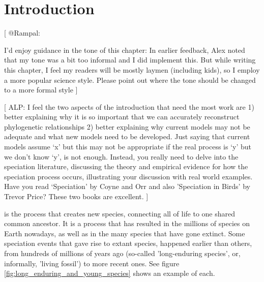 \chapter{Introduction}
\label{chapter_introduction}
\newpage

[
  @Rampal:

  I'd enjoy guidance in the tone of this chapter:
  In earlier feedback, Alex noted that my tone was a bit too informal
  and I did implement this.
  But while writing this chapter, I feel my readers will be mostly 
  laymen (including kids), so I employ a more popular science style.
  Please point out where the tone should be changed to a more formal style
]


[
  ALP:
  I feel the two aspects of the introduction that need the most work are 
  1) better explaining why it is so important 
     that we can accurately reconstruct phylogenetic relationships 
  2) better explaining why current models may not be adequate 
     and what new models need to be developed. Just saying that current 
     models assume ‘x’ but this may not be appropriate if the real process 
     is ‘y’ but we don’t know ‘y’, is not enough. Instead, you really need to 
     delve into the speciation literature, discussing the theory and 
     empirical evidence for how the speciation process occurs, 
     illustrating your discussion with real world examples. 
     Have you read ‘Speciation' by Coyne and Orr and also 'Speciation 
     in Birds' by Trevor Price? These two books are excellent.
]

\noindent 
{} is the process that creates new species,
connecting all of life to one shared common ancestor. It is a process
that has resulted in the millions of species on Earth nowadays, 
as well as in the many species that have gone extinct.
Some speciation events that gave rise to extant species, 
happened earlier than others,
from hundreds of millions of years ago (so-called 'long-enduring species',
or, informally, 'living fossil') 
to more recent ones. See figure \ref{fig:long_enduring_and_young_species} 
shows an example of each.

